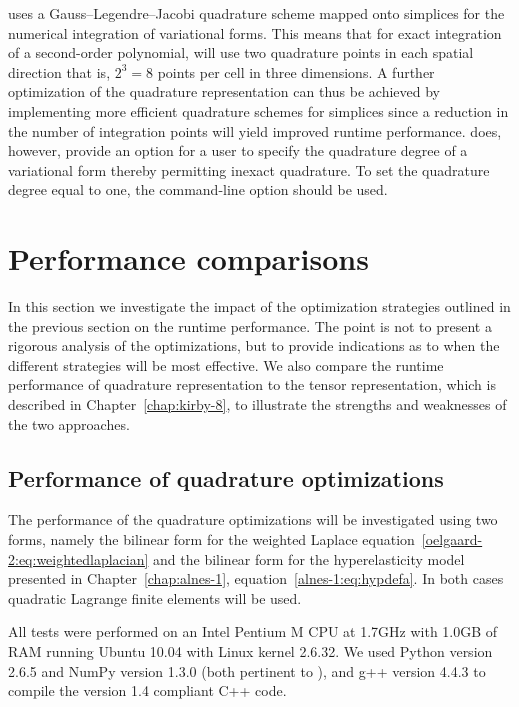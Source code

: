 \ffc{} uses a Gauss--Legendre--Jacobi quadrature scheme mapped onto
simplices for the numerical integration of variational forms.  This
means that for exact integration of a second-order polynomial, \ffc{}
will use two quadrature points in each spatial direction that is, $2^3
= 8$ points per cell in three dimensions.  A further optimization of
the quadrature representation can thus be achieved by implementing
more efficient quadrature schemes for simplices since a reduction in
the number of integration points will yield improved runtime
performance.  \ffc{} does, however, provide an option for a user to
specify the quadrature degree of a variational form thereby permitting
inexact quadrature.  To set the quadrature degree equal to one, the
command-line option  should be used.

\section{Performance comparisons}

In this section we investigate the impact of the optimization
strategies outlined in the previous section on the runtime
performance. The point is not to present a rigorous analysis of the
optimizations, but to provide indications as to when the different
strategies will be most effective. We also compare the runtime
performance of quadrature representation to the tensor representation,
which is described in Chapter~\ref{chap:kirby-8}, to illustrate the
strengths and weaknesses of the two approaches.

\subsection{Performance of quadrature optimizations}
\label{oelgaard-2:sec:quad_performance}

The performance of the quadrature optimizations will be investigated
using two forms, namely the bilinear form for the weighted Laplace
equation~\eqref{oelgaard-2:eq:weightedlaplacian} and the bilinear form
for the hyperelasticity model presented in Chapter~\ref{chap:alnes-1},
equation~\eqref{alnes-1:eq:hypdefa}.  In both cases quadratic Lagrange
finite elements will be used.

All tests were performed on an Intel Pentium M CPU at 1.7GHz with
1.0GB of RAM running Ubuntu 10.04 with Linux kernel 2.6.32.  We used
Python version 2.6.5 and NumPy version 1.3.0 (both pertinent to
\ffc{}), and g++ version 4.4.3 to compile the \ufc{} version 1.4
compliant C++ code.

